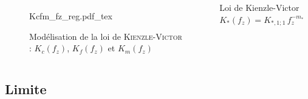 \documentclass{style/presentation}
\begin{document}
\begin{frame}

    \begin{columns}[c]
        \begin{figure}
            \centering
            \def\svgwidth{\textwidth}
            {Kcfm_fz_reg.pdf_tex}
            \caption{Modélisation de la loi de \textsc{Kienzle-Victor} : $K_c(f_z)$, $K_f(f_z)$ et $K_m(f_z)$}
        \end{figure}

        \begin{block}{Loi de Kienzle-Victor}
            \centering
            $K_*(f_z) = K_{*,1;1}\,f_z^{-m_*}$
        \end{block}
    \end{columns}
\end{frame}

\subsection{Limite}
\end{document}
